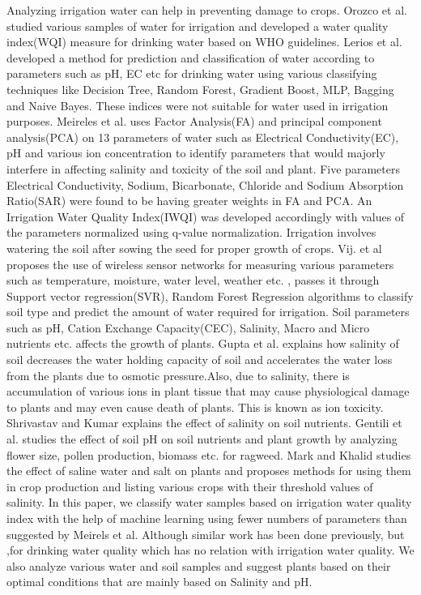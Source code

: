 Analyzing irrigation water can help in preventing damage to crops. Orozco et al.\cite{article:agricultureWQI} studied various samples of water for irrigation and developed a water quality index(WQI) measure for drinking water based on WHO guidelines. Lerios et al.\cite{article:patternExtraction} developed a method for prediction and classification of water according to parameters such as pH, EC etc for drinking water using various classifying techniques like Decision Tree\cite{article:decisionTree}, Random Forest\cite{article:randomForest}, Gradient Boost\cite{article:gradientBoosting}, MLP\cite{book:ann}, Bagging\cite{article:baggingClassifier} and Naive Bayes\cite{article:naiveBayes}. These indices were not suitable for water used in irrigation purposes. Meireles et al.\cite{article:agricultureWQI} uses Factor Analysis(FA) and principal component analysis(PCA) on 13 parameters of water such as Electrical Conductivity(EC), pH and various ion concentration to identify parameters that would majorly interfere in affecting salinity and toxicity of the soil and plant. Five parameters Electrical Conductivity, Sodium, Bicarbonate, Chloride and Sodium Absorption Ratio(SAR) were found to be having greater weights in FA and PCA. An Irrigation Water Quality Index(IWQI) was developed accordingly with values of the parameters normalized using q-value normalization. Irrigation involves watering the soil after sowing the seed for proper growth of crops. Vij. et al\cite{article:vijIot} proposes the use of wireless sensor networks for measuring various parameters such as temperature, moisture, water level, weather etc. , passes it through Support vector regression(SVR), Random Forest Regression algorithms to classify soil type and predict the amount of water required for irrigation. 
Soil parameters such as pH, Cation Exchange Capacity(CEC), Salinity, Macro and Micro nutrients etc. affects the growth of plants. Gupta et al.\cite{article:mechSalinity} explains how salinity of soil decreases the water holding capacity of soil and accelerates the water loss from the plants due to osmotic pressure.Also, due to salinity,  there is accumulation of various ions in plant tissue that may cause physiological damage to plants and may even cause death of plants. This is known as ion toxicity. Shrivastav and Kumar\cite{article:shrivastavSalinity} explains the effect of salinity on soil nutrients. Gentili et al.\cite{article:plantwithph} studies the effect of soil pH on soil nutrients and plant growth by analyzing flower size, pollen production, biomass etc. for ragweed. Mark and Khalid\cite{article:water&soilwithconductivity} studies the effect of saline water and salt on plants and proposes methods for using them in crop production and listing various crops with their threshold values of salinity. 
In this paper, we classify water samples based on irrigation water quality index with the help of machine learning using  fewer numbers of parameters than suggested by Meirels et al. Although similar work has been done previously, but ,for drinking water quality which has no relation with irrigation water quality. We also analyze various water and soil samples and suggest plants based on their optimal conditions that are mainly based on Salinity and pH.


